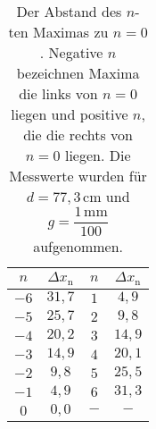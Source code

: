 \begin{table}[H]
    \centering
    \caption{Der Abstand des $n$-ten Maximas zu $n = 0$. Negative $n$ bezeichnen Maxima die links von $n = 0$ liegen und positive $n$, die die rechts von $n = 0$ liegen. Die Messwerte wurden für $d = 77,3 \, \unit{\centi\meter}$ und $g = \dfrac{1 \, \unit{\milli\meter}}{100}$ aufgenommen.}
    \label{tab:Well_100}
    \begin{tabular}{c c c c}
    \toprule
     $n$ & $\Delta x_\text{n}$ &   $n$ & $\Delta x_\text{n}$\\
    \midrule
    $-6$ &  $31,7 $&      $1$   &$4,9$ \\
    $-5$ &  $25,7 $&      $2$   &$9,8$ \\
    $-4$ &  $20,2 $&      $3$   &$14,9$ \\
    $-3$ &  $14,9 $&      $4$   &$20,1$ \\
    $-2$ &  $9,8  $&      $5$   &$25,5$ \\
    $-1$ &  $4,9  $&      $6$   &$31,3$ \\   
    $ 0$ &  $0,0  $&      $-$   &$-$    \\
    \bottomrule
    \end{tabular}
    \end{table}

